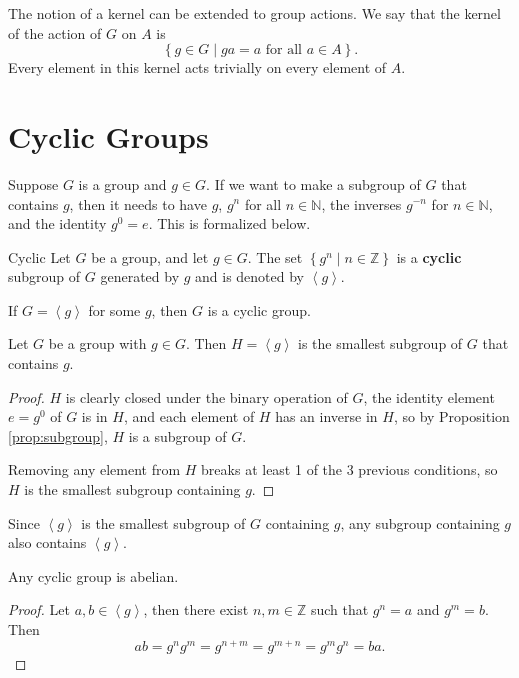 \documentclass[10pt]{report}
\begin{document}
The notion of a kernel can be extended to group actions. We say that the kernel of the action of $G$ on $A$ is
\[
	\left\{ g \in G \;|\; ga = a \text{ for all } a \in A \right\}.
\] Every element in this kernel acts trivially on every element of $A$.



\section{Cyclic Groups}

Suppose $G$ is a group and $g \in G$. If we want to make a subgroup of $G$ that contains $g$, then it needs to have $g$, $g^n$ for all $n \in \mathbb{N}$, the inverses $g^{-n}$ for $n \in \mathbb{N}$, and the identity $g^0 = e$. This is formalized below.

\begin{defn}{Cyclic}{}
	Let $G$ be a group, and let $g \in G$. The set $\left\{ g^n \;|\; n \in \mathbb{Z} \right\}$ is a \textbf{cyclic} subgroup of $G$ generated by $g$ and is denoted by $\left\langle g \right\rangle$.

	If $G = \left\langle g \right\rangle$ for some $g$, then $G$ is a cyclic group.
\end{defn}

\begin{thrm}{}{}
Let $G$ be a group with $g \in G$. Then $H=\left\langle g \right\rangle$ is the smallest subgroup of $G$ that contains $g$.
\end{thrm}
\begin{proof}
	$H$ is clearly closed under the binary operation of $G$, the identity element $e=g^0$ of $G$ is in $H$, and each element of $H$ has an inverse in $H$, so by Proposition \ref{prop:subgroup}, $H$ is a subgroup of $G$.

	Removing any element from $H$ breaks at least 1 of the 3 previous conditions, so $H$ is the smallest subgroup containing $g$.
\end{proof}

\begin{note}{}{}
Since $\left\langle g \right\rangle$ is the smallest subgroup of $G$ containing $g$, any subgroup containing $g$ also contains $\left\langle g \right\rangle$.
\end{note}

\begin{prop}
	Any cyclic group is abelian.
\end{prop}
\begin{proof}
	Let $a,b \in \left\langle g \right\rangle$, then there exist $n,m \in \mathbb{Z}$ such that $g^n=a$ and $g^m=b$. Then
	\[
	ab = g^n g^m = g^{n+m}=g^{m+n}=g^m g^n=ba.
	\] 
\end{proof}
\end{document}
